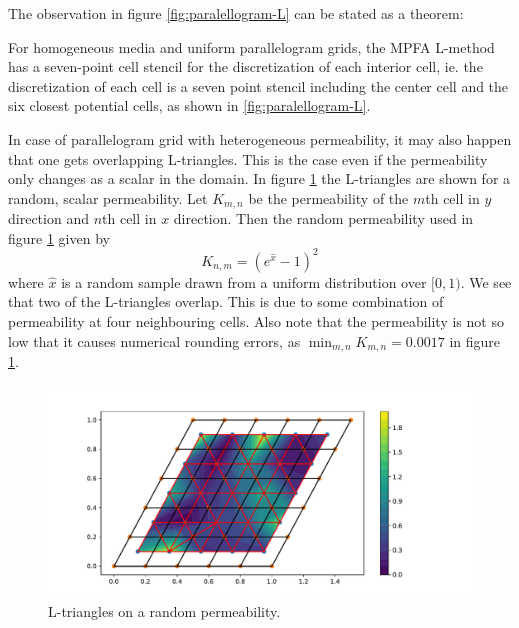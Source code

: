 \documentclass[../Main/main.tex]{subfiles}
\begin{document}
	The observation in figure \ref{fig:paralellogram-L} can be stated as a theorem:
	\begin{theorem}
		\label{th:L_triangulation}
		For homogeneous media and uniform parallelogram grids, the MPFA L-method
		has a seven-point cell stencil for the discretization of each interior cell, ie. the discretization of each cell is a seven point stencil including the center cell and the six closest potential cells, as shown in \ref{fig:paralellogram-L}.
	\end{theorem}
	In case of parallelogram grid with heterogeneous permeability, it may also happen that one gets overlapping L-triangles. This is the case even if the permeability only changes as a scalar in the domain. In figure \ref{fig:L-triangles-heterogeneous} the L-triangles are shown for a random, scalar permeability. Let $K_{m,n}$ be the permeability of the $m$th cell in $y$ direction and $n$th cell in $x$ direction. Then the random permeability used in figure \ref{fig:L-triangles-heterogeneous} given by
	\begin{equation}
		K_{n,m} = (e^{\hat{x}}-1)^2
	\end{equation}
	where $\hat{x}$ is a random sample drawn from a uniform distribution over $[0,1)$. We see that two of the L-triangles overlap. This is due to some combination of permeability at four neighbouring cells. Also note that the permeability is not so low that it causes numerical rounding errors, as $\min_{m,n}K_{m,n}=0.0017$ in figure \ref{fig:L-triangles-heterogeneous}.
	\begin{figure}[H]
		\centering
		\includegraphics[width=1.1\textwidth]{L-triangles-heterogenous.pdf}
		\caption{L-triangles on a random permeability.}
		\label{fig:L-triangles-heterogeneous}
	\end{figure}
\end{document}
